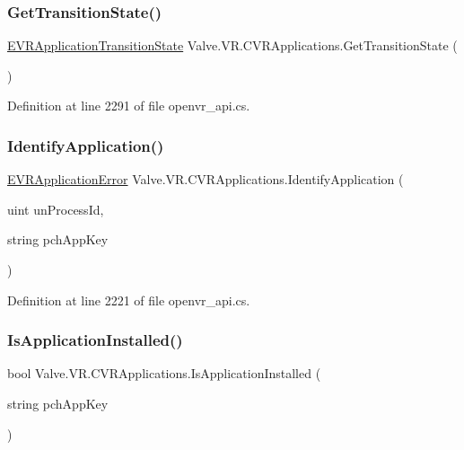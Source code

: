 \subsubsection{\texorpdfstring{GetTransitionState()}{GetTransitionState()}}
{\footnotesize\ttfamily \mbox{\hyperlink{namespace_valve_1_1_v_r_af00430caae64a19e9ad612ac01a208c0}{E\+V\+R\+Application\+Transition\+State}} Valve.\+V\+R.\+C\+V\+R\+Applications.\+Get\+Transition\+State (\begin{DoxyParamCaption}{ }\end{DoxyParamCaption})}



Definition at line 2291 of file openvr\+\_\+api.\+cs.

\mbox{\label{class_valve_1_1_v_r_1_1_c_v_r_applications_a095be14493fca1fabadbec251a216bb6}} 
\subsubsection{\texorpdfstring{IdentifyApplication()}{IdentifyApplication()}}
{\footnotesize\ttfamily \mbox{\hyperlink{namespace_valve_1_1_v_r_a3488adab8a219b579fcee50f4e63a8b6}{E\+V\+R\+Application\+Error}} Valve.\+V\+R.\+C\+V\+R\+Applications.\+Identify\+Application (\begin{DoxyParamCaption}\item[{uint}]{un\+Process\+Id,  }\item[{string}]{pch\+App\+Key }\end{DoxyParamCaption})}



Definition at line 2221 of file openvr\+\_\+api.\+cs.

\mbox{\label{class_valve_1_1_v_r_1_1_c_v_r_applications_a85a594e9e20b45a193d9145f0243eb00}} 
\subsubsection{\texorpdfstring{IsApplicationInstalled()}{IsApplicationInstalled()}}
{\footnotesize\ttfamily bool Valve.\+V\+R.\+C\+V\+R\+Applications.\+Is\+Application\+Installed (\begin{DoxyParamCaption}\item[{string}]{pch\+App\+Key }\end{DoxyParamCaption})}



